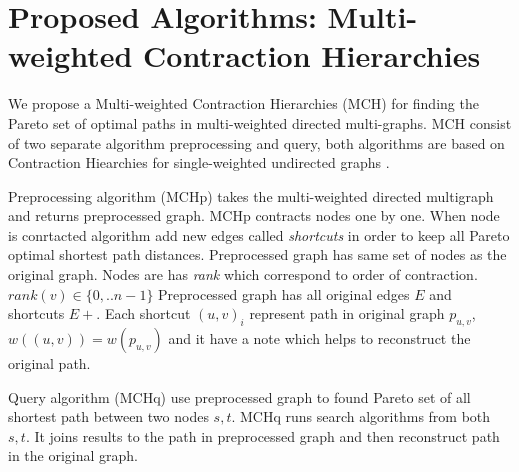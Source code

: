 
\section{Proposed Algorithms: Multi-weighted Contraction Hierarchies}

We propose a Multi-weighted Contraction Hierarchies (MCH) for finding the Pareto set
of optimal paths in multi-weighted directed multi-graphs. 
MCH consist of two separate algorithm preprocessing and query,
both algorithms are based on Contraction Hiearchies 
for single-weighted undirected graphs \cite{geisberger2008contraction}.


Preprocessing algorithm (MCHp) takes the multi-weighted directed multigraph
and returns preprocessed graph. MCHp contracts nodes one by one. 
When node is conrtacted algorithm add new edges called \emph{shortcuts} in order
to keep all Pareto optimal shortest path distances. 
Preprocessed graph has same set of nodes as the original graph.
Nodes are has \emph{rank} which correspond to order of contraction.
$rank(v) \in \{0,..n-1\}$
Preprocessed graph has all original edges $E$ and shortcuts $E+$.
Each shortcut $(u,v)_i$ represent 
path in original graph $p_{u,v}$, $w((u,v)) = w(p_{u,v})$ and it have a note which helps
to reconstruct the original path.

Query algorithm (MCHq) use preprocessed graph to found Pareto set of all
shortest path between two nodes $s, t$. MCHq runs search algorithms
from both $s, t$. 
It joins results to the path in preprocessed graph 
and then reconstruct path in the original graph.




